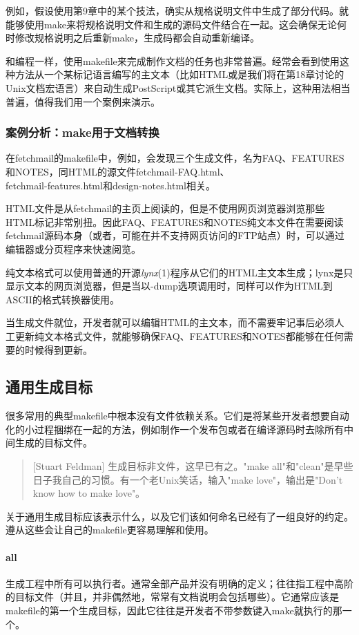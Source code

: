 \documentclass[12pt,oneside]{ctexbook}
\begin{document}
\begin{common-format}
例如，假设使用第9章中的某个技法，确实从规格说明文件中生成了部分代码。就能够使用make来将规格说明文件和生成的源码文件结合在一起。这会确保无论何时修改规格说明之后重新make，生成码都会自动重新编译。

和编程一样，使用makefile来完成制作文档的任务也非常普遍。经常会看到使用这种方法从一个某标记语言编写的主文本（比如HTML或是我们将在第18章讨论的Unix文档宏语言）来自动生成PostScript或其它派生文档。实际上，这种用法相当普遍，值得我们用一个案例来演示。

\subsubsection{案例分析：make用于文档转换}
在fetchmail的makefile中，例如，会发现三个生成文件，名为FAQ、FEATURES和NOTES，同HTML的源文件fetchmail-FAQ.html、\\ fetchmail-features.html和design-notes.html相关。

HTML文件是从fetchmail的主页上阅读的，但是不使用网页浏览器浏览那些HTML标记非常别扭。因此FAQ、FEATURES和NOTES纯文本文件在需要阅读fetchmail源码本身（或者，可能在并不支持网页访问的FTP站点）时，可以通过编辑器或分页程序来快速阅览。

纯文本格式可以使用普通的开源\textit{lynx}(1)程序从它们的HTML主文本生成；lynx是只显示文本的网页浏览器，但是当以-dump选项调用时，同样可以作为HTML到ASCII的格式转换器使用。

当生成文件就位，开发者就可以编辑HTML的主文本，而不需要牢记事后必须人工更新纯文本格式文件，就能够确保FAQ、FEATURES和NOTES都能够在任何需要的时候得到更新。


\subsection{通用生成目标}
很多常用的典型makefile中根本没有文件依赖关系。它们是将某些开发者想要自动化的小过程捆绑在一起的方法，例如制作一个发布包或者在编译源码时去除所有中间生成的目标文件。

\begin{quote}[Stuart Feldman]
生成目标非文件，这早已有之。"make all"和"clean"是早些日子我自己的习惯。有一个老Unix笑话，输入"make love"，输出是"Don't know how to make love"。
\end{quote}

关于通用生成目标应该表示什么，以及它们该如何命名已经有了一组良好的约定。遵从这些会让自己的makefile更容易理解和使用。

\paragraph{all}
生成工程中所有可以执行者。通常全部产品并没有明确的定义；往往指工程中高阶的目标文件（并且，并非偶然地，常常有文档说明会包括哪些）。它通常应该是makefile的第一个生成目标，因此它往往是开发者不带参数键入make就执行的那一个。


\end{common-format}
\end{document}
